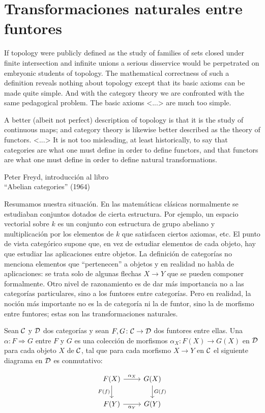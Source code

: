 \documentclass{article}
\numberwithin{equation}{section}
\theoremstyle{definition}
\begin{document}
\section{Transformaciones naturales entre funtores}


\epigraph{If topology were publicly defined as the study of families of sets
  closed under finite intersection and infinite unions a serious disservice
  would be perpetrated on embryonic students of topology. The mathematical
  correctness of such a definition reveals nothing about topology except that
  its basic axioms can be made quite simple. And with the category theory we are
  confronted with the same pedagogical problem. The basic axioms <...> are much
  too simple.

  A better (albeit not perfect) description of topology is that it is the study
  of continuous maps; and category theory is likewise better described as the
  theory of functors. <...> It is not too misleading, at least historically, to
  say that categories are what one must define in order to define functors, and
  that functors are what one must define in order to define natural
  transformations.}{Peter Freyd, introducción al libro\\``Abelian categories''
  (1964)}

Resumamos nuestra situación. En las matemáticas clásicas normalmente se
estudiaban conjuntos dotados de cierta estructura. Por ejemplo, un espacio
vectorial sobre $k$ es un conjunto con estructura de grupo abeliano y
multiplicación por los elementos de $k$ que satisfacen ciertos axiomas, etc. El
punto de vista categórico supone que, en vez de estudiar elementos de cada
objeto, hay que estudiar las aplicaciones entre objetos. La definición de
categorías no menciona elementos que ``pertenecen'' a objetos y en realidad no
habla de aplicaciones: se trata solo de algunas flechas $X\to Y$ que se pueden
componer formalmente. Otro nivel de razonamiento es de dar más importancia no a
las categorías particulares, sino a los funtores entre categorías. Pero en
realidad, la noción más importante no es la de categoría ni la de funtor, sino
la de morfismo entre funtores; estas son las transformaciones naturales.

\begin{definicion}
  Sean $\mathcal{C}$ y $\mathcal{D}$ dos categorías y sean
  $F,G\colon \mathcal{C} \to \mathcal{D}$ dos funtores entre ellas. Una
   $\alpha\colon F\Rightarrow G$ entre $F$ y $G$ es
  una colección de morfismos $\alpha_X\colon F(X) \to G(X)$ en $\mathcal{D}$ para
  cada objeto $X$ de $\mathcal{C}$, tal que para cada morfismo $X\to Y$ en
  $\mathcal{C}$ el siguiente diagrama en $\mathcal{D}$ es conmutativo:

  \[ \begin{tikzcd}
      F (X)\ar{r}{\alpha_X}\ar{d}[swap]{F (f)} & G (X)\ar{d}{G (f)} \\
      F (Y)\ar{r}[swap]{\alpha_Y} & G (Y)
    \end{tikzcd} \]
\end{definicion}
\end{document}
